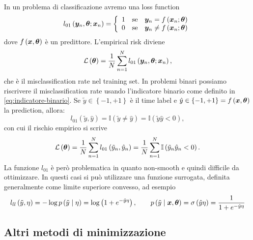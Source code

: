 \documentclass[10pt]{article}
\newcommand{\pare}[1]{
	\ensuremath{\left(#1\right)}
}
\begin{document}
\begin{example}
In un problema di classificazione avremo una loss function
\begin{equation}
l_{01}\pare{\ve{y}_n, \ve{\theta}; \ve{x}_n} = \left\{\begin{array}{l@{\quad\text{se}\quad}l}
1 & \ve{y}_n = f\pare{\ve{x}_n; \ve{\theta}} \\
0 & \ve{y}_n \neq f\pare{\ve{x}_n; \ve{\theta}} 
\end{array}\right.
\end{equation}
dove $f\pare{\ve{x}, \ve{\theta}}$ è un predittore. L'empirical risk diviene
\begin{equation}
\mathcal{L}\pare{\ve{\theta}} = \frac{1}{N}\sum_{n=1}^N l_{01}\pare{\ve{y}_n, \ve{\theta}; \ve{x}_n},
\end{equation}
che è il misclassification rate nel training set. In problemi binari possiamo
riscrivere il misclassification rate usando l'indicatore binario come definito
in \eqref{eq:indicatore-binario}. Se $\tilde{y} \in \left\{ -1, +1 \right\}$ è
il time label e $\hat{y}\in \left\{-1, +1\right\} = f\pare{\ve{x},
\ve{\theta}}$ la prediction, allora:
\begin{equation}
l_{01}\pare{\tilde{y}, \hat{y}} = \mathbb{I}\pare{\tilde{y}\neq\hat{y}} = \mathbb{I}\pare{\tilde{y}\hat{y}<0},
\end{equation}
con cui il rischio empirico si scrive
\begin{equation}
\mathcal{L}\pare{\ve{\theta}} = \frac{1}{N}\sum_{n=1}^{N}l_{01}\pare{\tilde{y}_n, \hat{y}_n} = \frac{1}{N}\sum_{n=1}^N\mathbb{I}\pare{\tilde{y}_n\hat{y}_n < 0}.
\end{equation}
La funzione $l_{01}$ è però problematica in quanto non-smooth e quindi difficile
da ottimizzare. In questi casi si può utilizzare una funzione surrogata,
definita generalmente come limite superiore convesso, ad esempio
\begin{equation}
l_{ll}\pare{\tilde{y}, \eta} = -\log{p\pare{\tilde{y}\cond\eta}} = \log\pare{1 + e^{-\tilde{y}\eta}},\qquad p\pare{\tilde{y}\cond\ve{x},\ve{\theta}} = \sigma\pare{\hat{y}\eta} = \frac{1}{1+e^{-\hat{y}\eta}}
\end{equation}
\end{example}

\subsection{Altri metodi di minimizzazione}
\end{document}
